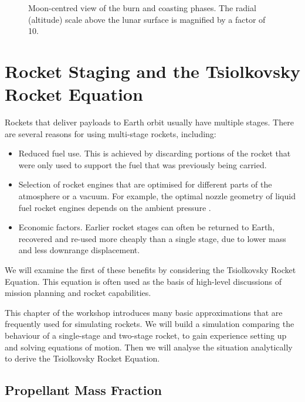 \documentclass[12pt,openany]{book}
\begin{document}
\begin{figure}[htbp]
  \centering
  \resizebox{0.5\textwidth}{!}{}
  \caption{Moon-centred view of the burn and coasting phases. The radial (altitude) scale above the lunar surface is magnified by a factor of 10.}
  \label{fig:lunar-ascent-moon-view}
\end{figure}

\chapter{Rocket Staging and the Tsiolkovsky Rocket Equation}

Rockets that deliver payloads to Earth orbit usually have multiple stages. There are several reasons for using multi-stage rockets, including:

\begin{itemize}
\item Reduced fuel use. This is achieved by discarding portions of the rocket that were only used to support the fuel that was previously being carried.
\item Selection of rocket engines that are optimised for different parts of the atmosphere or a vacuum. For example, the optimal nozzle geometry of liquid fuel rocket engines depends on the ambient pressure \cite{marble1964,huzel1967}.
\item Economic factors. Earlier rocket stages can often be returned to Earth, recovered and re-used more cheaply than a single stage, due to lower mass and less downrange displacement.
\end{itemize}

We will examine the first of these benefits by considering the Tsiolkovsky Rocket Equation. This equation is often used as the basis of high-level discussions of mission planning and rocket capabilities.

This chapter of the workshop introduces many basic approximations that are frequently used for simulating rockets. We will build a simulation comparing the behaviour of a single-stage and two-stage rocket, to gain experience setting up and solving equations of motion. Then we will analyse the situation analytically to derive the Tsiolkovsky Rocket Equation.

\section{Propellant Mass Fraction}
\end{document}
